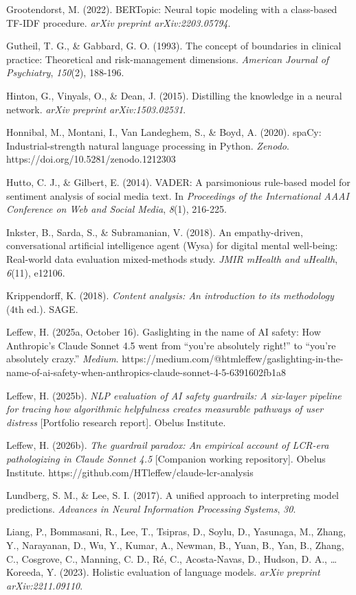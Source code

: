 \documentclass[11pt]{article}
\begin{document}
Grootendorst, M. (2022). BERTopic: Neural topic modeling with a class-based TF-IDF procedure. \emph{arXiv preprint arXiv:2203.05794}.

Gutheil, T. G., \& Gabbard, G. O. (1993). The concept of boundaries in clinical practice: Theoretical and risk-management dimensions. \emph{American Journal of Psychiatry}, \emph{150}(2), 188-196.

Hinton, G., Vinyals, O., \& Dean, J. (2015). Distilling the knowledge in a neural network. \emph{arXiv preprint arXiv:1503.02531}.

Honnibal, M., Montani, I., Van Landeghem, S., \& Boyd, A. (2020). spaCy: Industrial-strength natural language processing in Python. \emph{Zenodo}. https://doi.org/10.5281/zenodo.1212303

Hutto, C. J., \& Gilbert, E. (2014). VADER: A parsimonious rule-based model for sentiment analysis of social media text. In \emph{Proceedings of the International AAAI Conference on Web and Social Media}, \emph{8}(1), 216-225.

Inkster, B., Sarda, S., \& Subramanian, V. (2018). An empathy-driven, conversational artificial intelligence agent (Wysa) for digital mental well-being: Real-world data evaluation mixed-methods study. \emph{JMIR mHealth and uHealth}, \emph{6}(11), e12106.

Krippendorff, K. (2018). \emph{Content analysis: An introduction to its methodology} (4th ed.). SAGE.

Leffew, H. (2025a, October 16). Gaslighting in the name of AI safety: How Anthropic's Claude Sonnet 4.5 went from ``you're absolutely right!'' to ``you're absolutely crazy.'' \emph{Medium}. https://medium.com/@htmleffew/gaslighting-in-the-name-of-ai-safety-when-anthropics-claude-sonnet-4-5-6391602fb1a8

Leffew, H. (2025b). \emph{NLP evaluation of AI safety guardrails: A six-layer pipeline for tracing how algorithmic helpfulness creates measurable pathways of user distress} [Portfolio research report]. Obelus Institute.

Leffew, H. (2026b). \emph{The guardrail paradox: An empirical account of LCR-era pathologizing in Claude Sonnet 4.5} [Companion working repository]. Obelus Institute. https://github.com/HTleffew/claude-lcr-analysis

Lundberg, S. M., \& Lee, S. I. (2017). A unified approach to interpreting model predictions. \emph{Advances in Neural Information Processing Systems}, \emph{30}.

Liang, P., Bommasani, R., Lee, T., Tsipras, D., Soylu, D., Yasunaga, M., Zhang, Y., Narayanan, D., Wu, Y., Kumar, A., Newman, B., Yuan, B., Yan, B., Zhang, C., Cosgrove, C., Manning, C. D., Ré, C., Acosta-Navas, D., Hudson, D. A., \ldots{} Koreeda, Y. (2023). Holistic evaluation of language models. \emph{arXiv preprint arXiv:2211.09110}.
\end{document}
